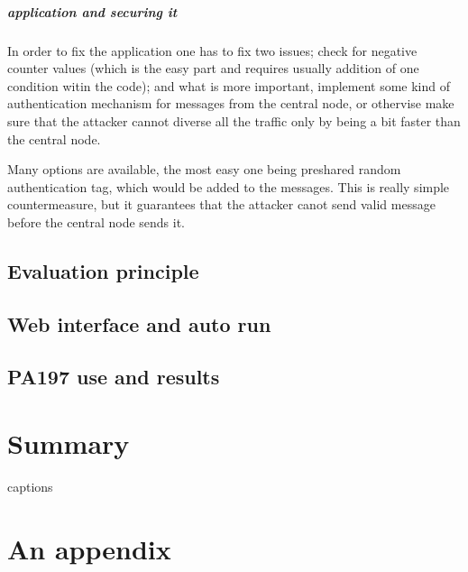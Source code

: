 \documentclass[
  digital, %
  table,   %
  nolof,     %
  nolot,     %
           oneside
]{fithesis3}
\begin{document}
    \paragraph{application and securing it}
    In order to fix the application one has to fix two issues; check for negative counter values (which is the easy part and requires usually addition of one condition witin the code); and what is more important, implement some kind of authentication mechanism for messages from the central node, or othervise make sure that the attacker cannot diverse all the traffic only by being a bit faster than the central node.

    Many options are available, the most easy one being preshared random authentication tag, which would be added to the messages. This is really simple countermeasure, but it guarantees that the attacker canot send valid message before the central node sends it. 

  \section{Evaluation principle}\label{sec:eval}
  \section{Web interface and auto run}
  \section{PA197 use and results}
\chapter{Summary}




{\csname captions\languagename\endcsname %
\makeatletter %
  \thesis@selectLocale{\thesis@locale}\makeatother
\printbibliography[heading=bibintoc]} %

\appendix %
\chapter{An appendix}
\end{document}

